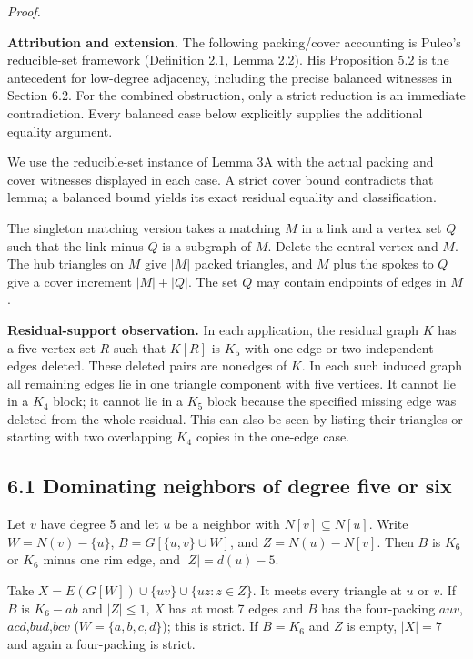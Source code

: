 \documentclass[11pt]{article}
\begin{document}
\emph{Proof.}

\textbf{Attribution and extension.} The following packing/cover
accounting is Puleo's reducible-set framework (Definition 2.1, Lemma
2.2). His Proposition 5.2 is the antecedent for low-degree adjacency,
including the precise balanced witnesses in Section 6.2. For the
combined obstruction, only a strict reduction is an immediate
contradiction. Every balanced case below explicitly supplies the
additional equality argument.

We use the reducible-set instance of Lemma 3A with the actual packing
and cover witnesses displayed in each case. A strict cover bound
contradicts that lemma; a balanced bound yields its exact residual
equality and classification.

The singleton matching version takes a matching \(M\) in a link and a
vertex set \(Q\) such that the link minus \(Q\) is a subgraph of \(M\).
Delete the central vertex and \(M\). The hub triangles on \(M\) give
\(|M|\) packed triangles, and \(M\) plus the spokes to \(Q\) give a
cover increment \(|M|+|Q|\). The set \(Q\) may contain endpoints of
edges in \(M\).

\textbf{Residual-support observation.} In each application, the residual
graph \(K\) has a five-vertex set \(R\) such that \(K[R]\) is \(K_5\)
with one edge or two independent edges deleted. These deleted pairs are
nonedges of \(K\). In each such induced graph all remaining edges lie in
one triangle component with five vertices. It cannot lie in a \(K_4\)
block; it cannot lie in a \(K_5\) block because the specified missing
edge was deleted from the whole residual. This can also be seen by
listing their triangles or starting with two overlapping \(K_4\) copies
in the one-edge case.

\subsection{6.1 Dominating neighbors of degree five or
six}\label{dominating-neighbors-of-degree-five-or-six}

Let \(v\) have degree 5 and let \(u\) be a neighbor with
\(N[v]\subseteq N[u]\). Write \(W=N(v)-\{u\}\), \(B=G[\{u,v\}\cup W]\),
and \(Z=N(u)-N[v]\). Then \(B\) is \(K_6\) or \(K_6\) minus one rim
edge, and \(|Z|=d(u)-5\).

Take \(X=E(G[W])\cup \{uv\}\cup \{uz:z\in Z\}\). It meets every triangle
at \(u\) or \(v\). If \(B\) is \(K_6-ab\) and \(|Z|\le 1\), \(X\) has at
most 7 edges and \(B\) has the four-packing
\(auv\),\(acd\),\(bud\),\(bcv\) (\(W=\{a,b,c,d\}\)); this is strict. If
\(B=K_6\) and \(Z\) is empty, \(|X|=7\) and again a four-packing is
strict.
\end{document}

